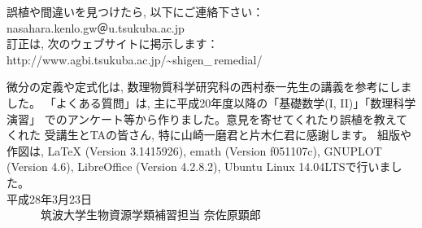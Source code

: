 誤植や間違いを見つけたら, 以下にご連絡下さい：\\
nasahara.kenlo.gw＠u.tsukuba.ac.jp\\
訂正は, 次のウェブサイトに掲示します：\\
http://www.agbi.tsukuba.ac.jp/\~{}shigen\_\,remedial/


{\small
微分の定義や定式化は, 数理物質科学研究科の西村泰一先生の講義を参考にしました。
「よくある質問」は, 主に平成20年度以降の「基礎数学(I, II)」「数理科学演習」
でのアンケート等から作りました。意見を寄せてくれたり誤植を教えてくれた
受講生とTAの皆さん, 特に山崎一磨君と片木仁君に感謝します。
組版や作図は, LaTeX (Version 3.1415926), emath (Version f051107c), 
GNUPLOT (Version 4.6), LibreOffice (Version 4.2.8.2), Ubuntu Linux 14.04LTSで行いました。\\

平成28年3月23日\\　　　筑波大学生物資源学類補習担当 奈佐原顕郎}
